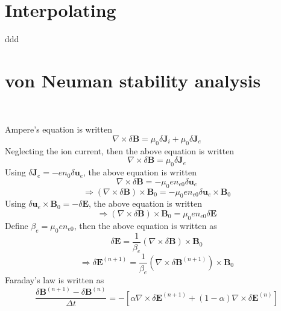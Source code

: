 \documentclass{article}
\begin{document}
\section{Interpolating}

ddd

\section{von Neuman stability analysis}

\

Ampere's equation is written
\begin{equation}
  \label{17-5-8-2} \nabla \times \delta \mathbf{B}= \mu_0 \delta \mathbf{J}_i
  + \mu_0 \delta \mathbf{J}_e
\end{equation}
Neglecting the ion current, then the above equation is written
\begin{equation}
  \nabla \times \delta \mathbf{B}= \mu_0 \delta \mathbf{J}_e
\end{equation}
Using $\delta \mathbf{J}_e = - e n_0 \delta \mathbf{u}_e$, the above equation
is written
\begin{equation}
  \nabla \times \delta \mathbf{B}= - \mu_0 e n_{e 0} \delta \mathbf{u}_e
\end{equation}
\begin{equation}
  \Rightarrow (\nabla \times \delta \mathbf{B}) \times \mathbf{B}_0 = - \mu_0
  e n_{e 0} \delta \mathbf{u}_e \times \mathbf{B}_0
\end{equation}
Using $\delta \mathbf{u}_e \times \mathbf{B}_0 = - \delta \mathbf{E}$, the
above equation is written
\begin{equation}
  \Rightarrow (\nabla \times \delta \mathbf{B}) \times \mathbf{B}_0 = \mu_0 e
  n_{e 0} \delta \mathbf{E}
\end{equation}
Define $\beta_e = \mu_0 e n_{e 0}$, then the above equation is written as
\begin{equation}
  \delta \mathbf{E}= \frac{1}{\beta_e} (\nabla \times \delta \mathbf{B})
  \times \mathbf{B}_0
\end{equation}
\begin{equation}
  \Rightarrow \delta \mathbf{E}^{(n + 1)} = \frac{1}{\beta_e} (\nabla \times
  \delta \mathbf{B}^{(n + 1)}) \times \mathbf{B}_0
\end{equation}
Faraday's law is written as
\begin{equation}
  \frac{\delta \mathbf{B}^{(n + 1)} - \delta \mathbf{B}^{(n)}}{\Delta t} = -
  [\alpha \nabla \times \delta \mathbf{E}^{(n + 1)} + (1 - \alpha) \nabla
  \times \delta \mathbf{E}^{(n)}]
\end{equation}
\end{document}
